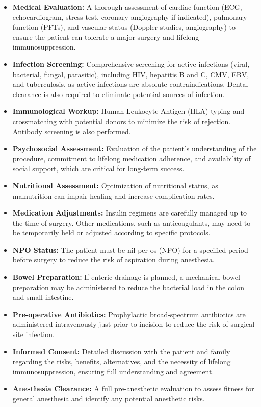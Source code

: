 \begin{itemize}
  \item \textbf{Medical Evaluation:} A thorough assessment of cardiac function (ECG, echocardiogram, stress test, coronary angiography if indicated), pulmonary function (PFTs), and vascular status (Doppler studies, angiography) to ensure the patient can tolerate a major surgery and lifelong immunosuppression.
  \item \textbf{Infection Screening:} Comprehensive screening for active infections (viral, bacterial, fungal, parasitic), including HIV, hepatitis B and C, CMV, EBV, and tuberculosis, as active infections are absolute contraindications. Dental clearance is also required to eliminate potential sources of infection.
  \item \textbf{Immunological Workup:} Human Leukocyte Antigen (HLA) typing and crossmatching with potential donors to minimize the risk of rejection. Antibody screening is also performed.
  \item \textbf{Psychosocial Assessment:} Evaluation of the patient's understanding of the procedure, commitment to lifelong medication adherence, and availability of social support, which are critical for long-term success.
  \item \textbf{Nutritional Assessment:} Optimization of nutritional status, as malnutrition can impair healing and increase complication rates.
  \item \textbf{Medication Adjustments:} Insulin regimens are carefully managed up to the time of surgery. Other medications, such as anticoagulants, may need to be temporarily held or adjusted according to specific protocols.
  \item \textbf{NPO Status:} The patient must be nil per os (NPO) for a specified period before surgery to reduce the risk of aspiration during anesthesia.
  \item \textbf{Bowel Preparation:} If enteric drainage is planned, a mechanical bowel preparation may be administered to reduce the bacterial load in the colon and small intestine.
  \item \textbf{Pre-operative Antibiotics:} Prophylactic broad-spectrum antibiotics are administered intravenously just prior to incision to reduce the risk of surgical site infection.
  \item \textbf{Informed Consent:} Detailed discussion with the patient and family regarding the risks, benefits, alternatives, and the necessity of lifelong immunosuppression, ensuring full understanding and agreement.
  \item \textbf{Anesthesia Clearance:} A full pre-anesthetic evaluation to assess fitness for general anesthesia and identify any potential anesthetic risks.
\end{itemize}

